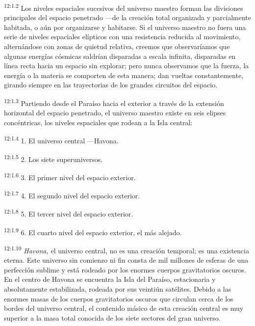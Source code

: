 \par
\textsuperscript{12:1.2} Los niveles espaciales sucesivos del universo maestro forman las divisiones principales del espacio penetrado ---de la creación total organizada y parcialmente habitada, o aún por organizarse y habitarse. Si el universo maestro no fuera una serie de niveles espaciales elípticos con una resistencia reducida al movimiento, alternándose con zonas de quietud relativa, creemos que observaríamos que algunas energías cósmicas saldrían disparadas a escala infinita, disparadas en línea recta hacia un espacio sin explorar; pero nunca observamos que la fuerza, la energía o la materia se comporten de esta manera; dan vueltas constantemente, girando siempre en las trayectorias de los grandes circuitos del espacio.

\par
\textsuperscript{12:1.3} Partiendo desde el Paraíso hacia el exterior a través de la extensión horizontal del espacio penetrado, el universo maestro existe en seis elipses concéntricas, los niveles espaciales que rodean a la Isla central:

\par
\textsuperscript{12:1.4} 1. El universo central ---Havona.

\par
\textsuperscript{12:1.5} 2. Los siete superuniversos.

\par
\textsuperscript{12:1.6} 3. El primer nivel del espacio exterior.

\par
\textsuperscript{12:1.7} 4. El segundo nivel del espacio exterior.

\par
\textsuperscript{12:1.8} 5. El tercer nivel del espacio exterior.

\par
\textsuperscript{12:1.9} 6. El cuarto nivel del espacio exterior, el más alejado.

\par
\textsuperscript{12:1.10} \textit{Havona,} el universo central, no es una creación temporal; es una existencia eterna. Este universo sin comienzo ni fin consta de mil millones de esferas de una perfección sublime y está rodeado por los enormes cuerpos gravitatorios oscuros. En el centro de Havona se encuentra la Isla del Paraíso, estacionaria y absolutamente estabilizada, rodeada por sus veintiún satélites. Debido a las enormes masas de los cuerpos gravitatorios oscuros que circulan cerca de los bordes del universo central, el contenido másico de esta creación central es muy superior a la masa total conocida de los siete sectores del gran universo.

